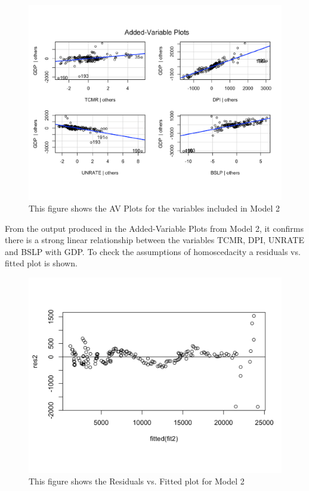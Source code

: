 \documentclass[12pt]{article}
\begin{document}
\begin{figure}[H]
  \centering
  \includegraphics[scale = .5]{AVP2}
  \caption{This figure shows the AV Plots for the variables included in Model 2}
\end{figure}
From the output produced in the Added-Variable Plots from Model 2, it confirms there is a strong linear relationship between the variables TCMR, DPI, UNRATE and BSLP with GDP. 
To check the assumptions of homoscedacity a residuals vs. fitted plot is shown.
\begin{figure}[H]
  \centering
  \includegraphics[scale = .35]{res2}
  \caption{This figure shows the Residuals vs. Fitted plot for Model 2}
\end{figure}
\end{document}
